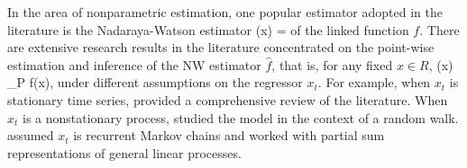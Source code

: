 In the area of nonparametric estimation, one popular estimator adopted in the literature is the Nadaraya-Watson estimator
\bestar
  (x) = 
\eestar
of the linked function $f$. There are extensive research results in the literature concentrated on the point-wise estimation and inference of the NW estimator $\widehat{f}$, that is, for any fixed $x \in R$,
\bestar
{}(x) \to_P f(x),
\eestar
under different assumptions on the regressor $x_t$. For example, when $x_t$ is stationary time series, \cite{hardlelutkepohlchen1997} provided a comprehensive review of the literature. When $x_t$ is a nonstationary process, \cite{phillipspark1998} studied the model in the context of a random walk. \cite{karlsentjostheim2001} assumed $x_t$ is recurrent Markov chains and \citet[][\citeyear{wangphillips2010a}, \citeyear{wangphillips2010b}]{wangphillips2009} worked with partial sum representations of general linear processes. 

